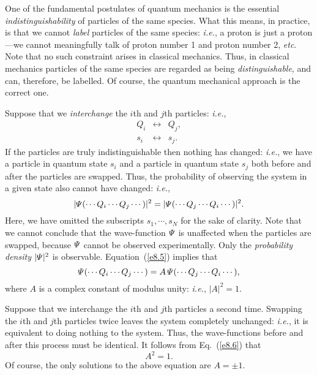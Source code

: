 One of the fundamental postulates of quantum mechanics is the essential
{\em indistinguishability}\/ of particles of the same species. What this
means, in practice, is that we cannot {\em label}\/ particles of the same
species:
 {\em i.e.}, a proton is just a proton---we cannot meaningfully  talk of proton number 1 and proton number 2, {\em etc}.
Note that no such constraint arises in classical mechanics. Thus, in
classical mechanics particles of the
same species are regarded as being {\em distinguishable}, 
and can, therefore, be labelled. Of course, the quantum mechanical approach is the correct one.

Suppose that we {\em interchange}\/ the $i$th and $j$th particles:
{\em i.e.},
\begin{eqnarray}
Q_i &\leftrightarrow & Q_j,\\[0.5ex]
s_i & \leftrightarrow & s_j.
\end{eqnarray}
 If the particles
are truly indistinguishable then nothing has changed: 
{\em i.e.}, we have a particle
in quantum state $s_i$ and a particle in quantum state $s_j$ both before
and after the particles are swapped. Thus, the probability of observing the
system in a given state also cannot have changed: {\em i.e.},
\begin{equation}
|{\mit\Psi}(\cdots Q_i\cdots Q_j\cdots)|^2=
|{\mit\Psi}(\cdots Q_j\cdots Q_i\cdots)|^2.\label{e8.5}
\end{equation}
Here, we have omitted the subscripts $s_1,\cdots,s_N$ for the sake of
clarity.
Note that we cannot conclude that the wave-function ${\mit \Psi}$ is unaffected
when the particles are swapped, because ${\mit\Psi}$ cannot be observed
experimentally. Only the {\em probability density} $|{\mit\Psi}|^2$ is observable.
Equation~(\ref{e8.5}) implies that
\begin{equation}\label{e8.6}
{\mit\Psi}(\cdots Q_i\cdots Q_j\cdots)=A\,{\mit\Psi}(\cdots Q_j\cdots Q_i\cdots),
\end{equation}
where $A$ is a complex constant of modulus unity: {\em i.e.}, $|A|^2=1$. 

Suppose that we interchange  the $i$th and $j$th particles a second time. 
Swapping the $i$th and $j$th particles twice leaves the system completely
unchanged: {\em i.e.}, it is equivalent to doing nothing to the system.
Thus, the wave-functions before and after this process must be identical.
It follows from Eq.~(\ref{e8.6}) that
\begin{equation}
A^2 = 1.
\end{equation}
Of course, the only solutions to the above equation are $A=\pm 1$. 

